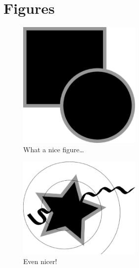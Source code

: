 \documentclass[a4paper,12pt]{article}
\begin{document}
\newpage


\section*{Figures}


\begin{figure}[h!]
  \caption{What a nice figure\dots}
  \label{Fig1}
  \begin{center}
    \includegraphics[width=6cm]{Fig1}
  \end{center}
\end{figure}


\newpage


\begin{figure}[h!]
  \caption{Even nicer!}
  \label{Fig2}
  \begin{center}
    \includegraphics[width=6cm]{Fig2}
  \end{center}
\end{figure}
\end{document}
